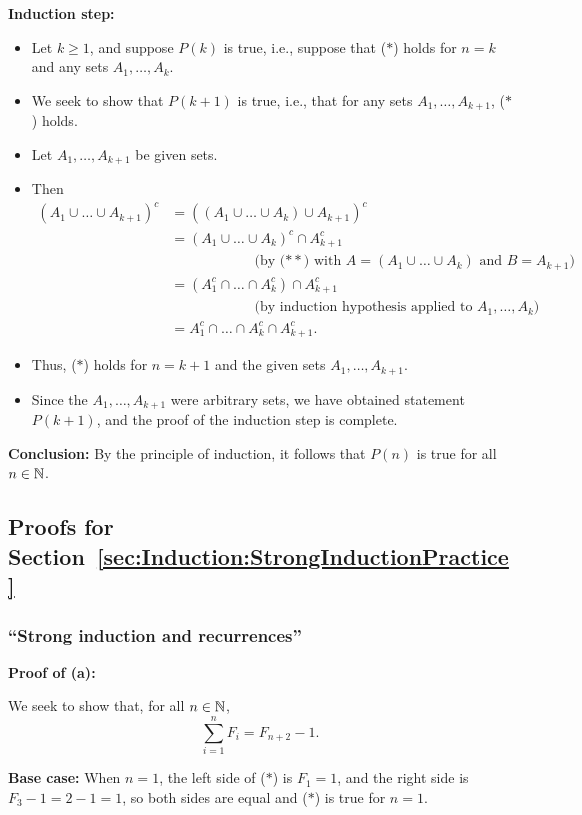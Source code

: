 \textbf{Induction step:} 
\begin{itemize}
\item Let $k\ge 1$, and suppose $P(k)$ is true, i.e.,
suppose that ($*$) holds for $n=k$ and any sets $A_1,\dots,A_k$.
\item
We seek to show that $P(k+1)$ is true, i.e., that for
any sets $A_1,\dots,A_{k+1}$, ($*$) holds. 
\item
Let $A_1,\dots,A_{k+1}$  be given sets.
\item
Then
\begin{align*}
\left(A_1\cup \dots \cup A_{k+1}\right)^c
&=\left(\left(A_1\cup \dots \cup A_{k}\right)\cup A_{k+1}\right)^c
\\
&=\left(A_1\cup \dots \cup A_{k}\right)^c\cap A_{k+1}^c
\quad\\
& \qquad \qquad\qquad \text{(by ($**$) with $A=(A_1\cup \dots \cup A_k)$ and 
$B=A_{k+1}$)}
\\
&=\left(A_1^c\cap\dots \cap A_k^c\right)\cap A_{k+1}^c\\
& \qquad \qquad\qquad \text{(by induction hypothesis applied to $A_1,\dots, A_k$)}
\\
&=A_1^c\cap\dots \cap A_k^c\cap A_{k+1}^c.
\end{align*}
\item
Thus, ($*$) holds for $n=k+1$
and the given sets $A_1,\dots,A_{k+1}$.
\item 
Since the $A_1,\dots,A_{k+1}$ were
arbitrary sets, we have obtained statement $P(k+1)$, and the 
proof of the induction step is complete.
\end{itemize}

\textbf{Conclusion:} By the principle of induction, 
it follows that $P(n)$ is true for all $n\in\mathbb{N}$.  
 

\subsection{Proofs for Section~\ref{sec:Induction:StrongInductionPractice}}
\subsubsection{``Strong induction and recurrences''}

\noindent
\textbf{Proof of (a):}

We seek to show that, for all $n\in\mathbb{N}$, 
\[
\tag{$*$}
\sum_{i=1}^n F_i=F_{n+2}-1.
\]

\textbf{Base case:} When $n=1$, the left side of ($*$) is $F_1 =1$,
and the
right side is $F_3-1=2-1=1$, so both sides are equal and ($*$) is
true for $n=1$.

